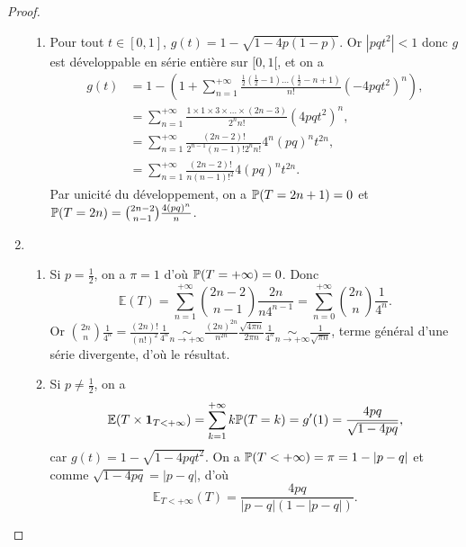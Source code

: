 \documentclass[12pt]{article}
\begin{document}
\begin{proof}
\begin{enumerate}
\begin{enumerate}
            \item Pour tout $t\in[0,1]$, $g(t)=1-\sqrt{1-4p(1-p)}$. Or $\left\lvert pqt^{2}\right\rvert<1$ donc $g$ est développable en série entière sur $[0,1[$, et on a 
            \begin{align}
                g(t)
                &=1-\left(1+\sum_{n=1}^{+\infty}\frac{\frac{1}{2}\left(\frac{1}{2}-1\right)\dots\left(\frac{1}{2}-n+1\right)}{n!}(-4pqt^{2})^{n}\right),\\
                &=\sum_{n=1}^{+\infty}\frac{1\times 1\times 3\times\dots\times(2n-3)}{2^{n}n!}(4pqt^{2})^{n},\\
                &=\sum_{n=1}^{+\infty}\frac{(2n-2)!}{2^{n-1}(n-1)!2^{n}n!}4^{n}(pq)^{n}t^{2n},\\
                &=\sum_{n=1}^{+\infty}\frac{(2n-2)!}{n(n-1)!^{2}}4(pq)^{n}t^{2n}.
            \end{align}
            Par unicité du développement, on a $\P(T=2n+1)=0$ et $\P(T=2n)=\binom{2n-2}{n-1}\frac{4(pq)^{n}}{n}$.
        \end{enumerate}

        \item 
        \begin{enumerate}
            \item Si $p=\frac{1}{2}$, on a $\pi=1$ d'où $\P(T=+\infty)=0$. Donc 
            \begin{equation}
                \mathbb{E}(T)=\sum_{n=1}^{+\infty}\binom{2n-2}{n-1}\frac{2n}{n4^{n-1}}=\sum_{n=0}^{+\infty}\binom{2n}{n}\frac{1}{4^{n}}.
            \end{equation}
            Or $\binom{2n}{n}\frac{1}{4^{n}}=\frac{(2n)!}{(n!)^{2}}\frac{1}{4^{n}}\underset{n\to+\infty}{\sim}\frac{(2n)^{2n}}{n^{2n}}\frac{\sqrt{4\pi n}}{2\pi n}\frac{1}{4^{n}}\underset{n\to+\infty}{\sim}\frac{1}{\sqrt{\pi n}}$, terme général d'une série divergente, d'où le résultat.

            \item Si $p\neq\frac{1}{2}$, on a 
            \begin{equation}
                \mathbb{E}(T\times \mathbf{1}_{T<+\infty})=\sum_{k=1}^{+\infty}k\P(T=k)=g'(1)=\frac{4pq}{\sqrt{1-4pq}},
            \end{equation}
            car $g(t)=1-\sqrt{1-4pqt^{2}}$. On a $\P(T<+\infty)=\pi=1-\left\lvert p-q\right\rvert$ et comme $\sqrt{1-4pq}=\left\lvert p-q\right\rvert$, d'où 
            \begin{equation}
                \mathbb{E}_{T<+\infty}(T)=\frac{4pq}{\left\lvert p-q\right\rvert(1-\left\lvert p-q\right\rvert)}.
            \end{equation}
        \end{enumerate}


\end{enumerate}
\end{proof}
\end{document}
